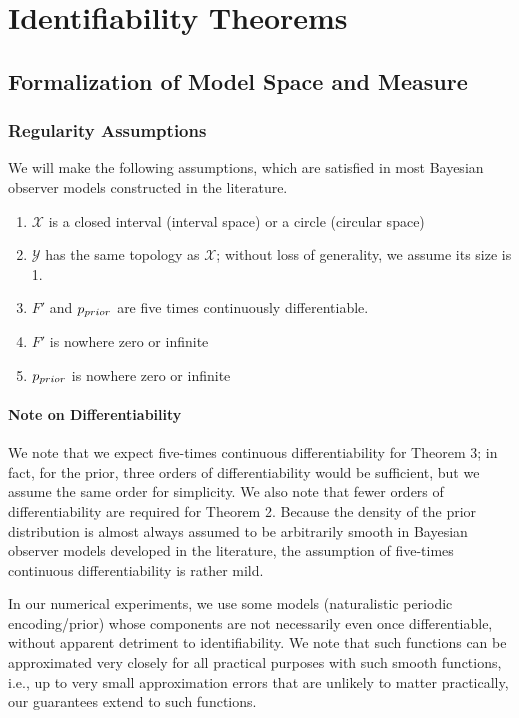 



\section{Identifiability Theorems}

\subsection{Formalization of Model Space and Measure}


\subsubsection{Regularity Assumptions}\label{sec:basic-setup}

We will make the following assumptions, which are satisfied in most Bayesian observer models constructed in the literature.
\begin{enumerate}
\item $\mathcal{X}$ is a closed interval (interval space) or a circle (circular space)
\item $\mathcal{Y}$ has the same topology as $\mathcal{X}$; without loss of generality, we assume its size is 1.
    \item $F'$ and $p_{prior}$ are five times continuously differentiable.
    
    \item $F'$ is nowhere zero or infinite
    \item $p_{prior}$ is nowhere zero or infinite
\end{enumerate}

\paragraph*{Note on Differentiability}
We note that we expect five-times continuous differentiability for Theorem 3; in fact, for the prior, three orders of differentiability would be sufficient, but we assume the same order for simplicity.
We also note that fewer orders of differentiability are required for Theorem 2. Because the density of the prior distribution is almost always assumed to be arbitrarily smooth in Bayesian observer models developed in the literature, the assumption  of five-times continuous differentiability is rather mild.

In our numerical experiments, we use some models (naturalistic periodic encoding/prior) whose components are not necessarily even once differentiable, without apparent detriment to identifiability. We note that such functions can be approximated very closely for all practical purposes with such smooth functions, i.e., up to very small approximation errors that are unlikely to matter practically, our guarantees extend to such functions.

